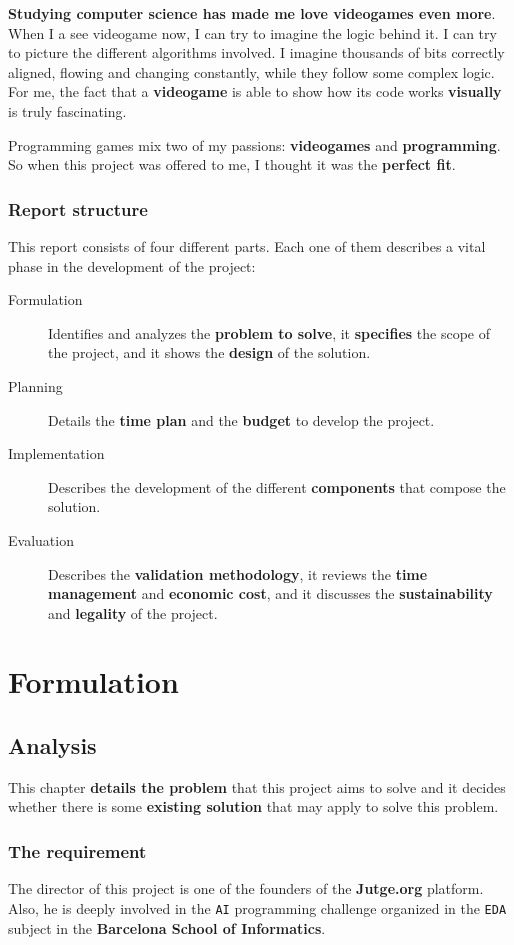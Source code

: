 \documentclass[a4paper,11pt,titlepage,abstract,numbers=noenddot,automark,mnsy,intlimits,rgb,dvipsnames]{report}
\begin{document}
\textbf{Studying computer science has made me love videogames even more}. When I a see videogame now, I can try to
imagine the logic
behind it. I can try to picture the different algorithms involved. I imagine thousands of bits correctly aligned,
flowing and changing constantly, while they follow some complex logic. For me, the fact that a \textbf{videogame} is
able to show how its code works \textbf{visually} is truly fascinating.

Programming games mix two of my passions: \textbf{videogames} and \textbf{programming}. So when this project was offered to me,
I thought it was the \textbf{perfect fit}.
\section{Report structure}
This report consists of four different parts. Each one of them describes a vital phase in the development of
the project:
\begin{description}
\item[Formulation]
Identifies and analyzes the \textbf{problem to solve}, it \textbf{specifies} the scope of
  the project, and it shows the \textbf{design} of the solution.
\item[Planning]
Details the \textbf{time plan} and the \textbf{budget} to develop the project.
\item[Implementation]
Describes the development of the different \textbf{components} that compose the solution.
\item[Evaluation]
Describes the \textbf{validation methodology}, it reviews the \textbf{time management} and \textbf{economic cost},
  and it discusses the \textbf{sustainability} and \textbf{legality} of the project.
\end{description}
\part{Formulation}
\chapter{Analysis}
This chapter \textbf{details the problem} that this project aims to solve and it decides whether there is some \textbf{existing
solution} that may apply to solve this problem.
\section{The requirement}
\label{requirement}
The director of this project is one of the founders of the \textbf{Jutge.org} platform. Also, he is deeply involved in the \texttt{AI}
programming challenge organized in the \texttt{EDA} subject in the \textbf{Barcelona School of Informatics}.
\end{document}

